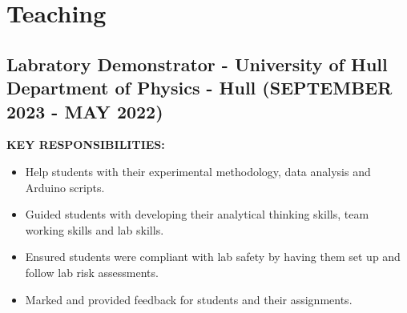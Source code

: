\documentclass{article}
\begin{document}
\section{Teaching}
\subsection{Labratory Demonstrator - \textnormal{University of Hull Department of Physics - Hull} \footnotesize{(SEPTEMBER 2023 - MAY 2022)}}
\begin{minipage}[t]{1\textwidth}
    \footnotesize{\textbf{KEY RESPONSIBILITIES:}}
    \normalsize{}
    \begin{itemize}[leftmargin=*]
        \item Help students with their experimental methodology, data analysis and Arduino scripts. 
        \item Guided students with developing their analytical thinking skills, team working skills and lab skills. 
        \item Ensured students were compliant with lab safety by having them set up and follow lab risk assessments. 
        \item Marked and provided feedback for students and their assignments.     
    \end{itemize}
\end{minipage}
\hfill
\end{document}
